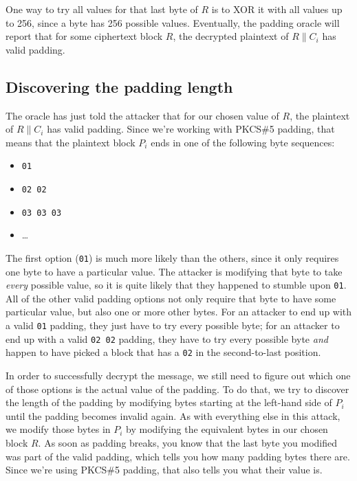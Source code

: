 \documentclass[11pt,ebook,table,dvipsnames]{memoir}
\begin{document}
One way to try all values for that last byte of $R$ is to XOR it with
all values up to 256, since a byte has 256 possible values.
Eventually, the padding oracle will report that for some ciphertext
block $R$, the decrypted plaintext of $R \| C_i$ has valid padding.
\subsection{Discovering the padding length}
\label{sec-2-3-9-2}

The oracle has just told the attacker that for our chosen value of
$R$, the plaintext of $R \| C_i$ has valid padding. Since we're
working with PKCS\#5 padding, that means that the plaintext block $P_i$
ends in one of the following byte sequences:

\begin{itemize}
\item \verb~01~
\item \verb~02 02~
\item \verb~03 03 03~
\item \ldots
\end{itemize}

The first option (\verb~01~) is much more likely than the others, since it
only requires one byte to have a particular value. The attacker is
modifying that byte to take \emph{every} possible value, so it is quite
likely that they happened to stumble upon \verb~01~. All of the other valid
padding options not only require that byte to have some particular
value, but also one or more other bytes. For an attacker to end up
with a valid \verb~01~ padding, they just have to try every possible byte;
for an attacker to end up with a valid \verb~02 02~ padding, they have to
try every possible byte \emph{and} happen to have picked a block that has a
\verb~02~ in the second-to-last position.

In order to successfully decrypt the message, we still need to figure
out which one of those options is the actual value of the padding. To
do that, we try to discover the length of the padding by modifying
bytes starting at the left-hand side of $P_i$ until the padding
becomes invalid again. As with everything else in this attack, we
modify those bytes in $P_i$ by modifying the equivalent bytes in our
chosen block $R$. As soon as padding breaks, you know that the last
byte you modified was part of the valid padding, which tells you how
many padding bytes there are. Since we're using PKCS\#5 padding, that
also tells you what their value is.
\end{document}
